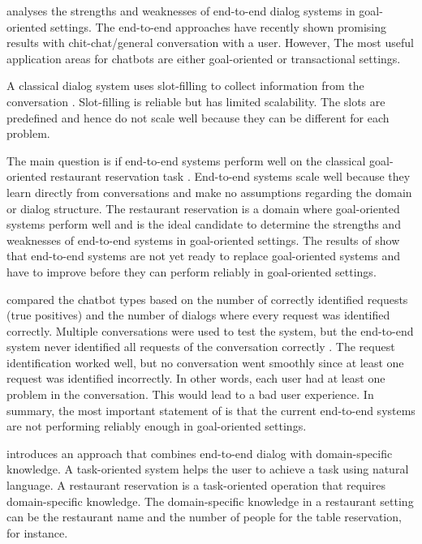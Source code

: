\citet{bordes2016learning} analyses the strengths and weaknesses of end-to-end dialog systems in goal-oriented settings.
The end-to-end approaches have recently shown promising results with chit-chat/general conversation with a user.
However, The most useful application areas for chatbots are either goal-oriented or transactional settings.

A classical dialog system uses slot-filling to collect information from the conversation \cite{bordes2016learning}.
Slot-filling is reliable but has limited scalability.
The slots are predefined and hence do not scale well because they can be different for each problem. 

The main question is if end-to-end systems perform well on the classical goal-oriented restaurant reservation task \cite{bordes2016learning}.
End-to-end systems scale well because they learn directly from conversations and make no assumptions regarding the domain or dialog structure. 
The restaurant reservation is a domain where goal-oriented systems perform well and is the ideal candidate to determine the strengths and weaknesses of end-to-end systems in goal-oriented settings.
The results of \citet{bordes2016learning} show that end-to-end systems are not yet ready to replace goal-oriented systems and have to improve before they can perform reliably in goal-oriented settings. 

\citet{bordes2016learning} compared the chatbot types based on the number of correctly identified requests (true positives) and the number of dialogs where every request was identified correctly.
Multiple conversations were used to test the system, but the end-to-end system never identified all requests of the conversation correctly \cite{bordes2016learning}.
The request identification worked well, but no conversation went smoothly since at least one request was identified incorrectly.
In other words, each user had at least one problem in the conversation.
This would lead to a bad user experience. 
In summary, the most important statement of \citet{bordes2016learning} is that the current end-to-end systems are not performing reliably enough in goal-oriented settings.

\citet{williams2017hybrid} introduces an approach that combines end-to-end dialog with domain-specific knowledge.
A task-oriented system helps the user to achieve a task using natural language.
A restaurant reservation is a task-oriented operation that requires domain-specific knowledge.
The domain-specific knowledge in a restaurant setting can be the restaurant name and the number of people for the table reservation, for instance. 

